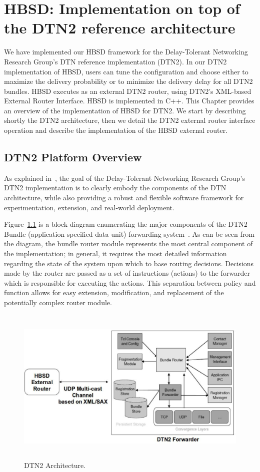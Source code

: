 \chapter{HBSD: Implementation on top of the DTN2 reference architecture}
\label{chapter:HBSD}
\minitoc

We have implemented our HBSD framework for the Delay-Tolerant Networking Research Group's DTN reference implementation (DTN2). 
In our DTN2 implementation of HBSD, users can tune the configuration and choose either to maximize the delivery probability or to minimize the delivery delay for all DTN2 bundles. HBSD executes as an external DTN2 router, using DTN2's XML-based External Router Interface. HBSD is implemented in C++. This Chapter provides an overview of the implementation of HBSD for DTN2. We start by describing shortly the DTN2 architecture, then we detail the DTN2 external router interface operation and describe the implementation of the HBSD external router.

\section{DTN2 Platform Overview}
\label{DTN2}

As explained in~\cite{DTN2Manual}, the goal of the Delay-Tolerant Networking Research Group's DTN2 implementation is to clearly embody the components of the DTN architecture, while also providing a robust and flexible software framework for experimentation, extension, and real-world deployment.

Figure~\ref{DTN2-Arch} is a block diagram enumerating the major components of the DTN2 Bundle (application specified data 
unit) forwarding system~\cite{Demmer03implementingdelay}. As can be seen from the diagram, the bundle router module represents the most central component of the implementation; in general, it requires the most detailed information regarding the state of the system upon which to base routing decisions. Decisions made by the router are passed as a set of instructions (actions) to the forwarder which is responsible for executing the actions. This separation between policy and function allows for easy extension, modification, and replacement of the potentially complex router module. 

\begin{figure}[!h]
\centering
\includegraphics[width=5in,height=3in]{Chapitre4/HBSD-DTN2.eps}
\caption{DTN2 Architecture.}
\label{DTN2-Arch}
\end{figure}

